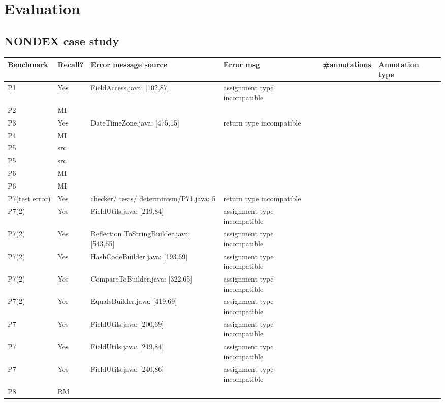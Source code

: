 \section{Evaluation}
\subsection{NONDEX case study}
\begin{table}[]
    \begin{tabular}{|p{1.5cm}|p{1cm}|p{3cm}|p{4cm}|p{2cm}|p{1.5cm}|}
        \hline
        Benchmark & Recall? & Error message source & Error msg & \#annotations & Annotation type  \\ \hline
        P1 & Yes & FieldAccess.java: [102,87] & assignment type incompatible &  &   \\
        P2 & MI &  &  &  &  \\
        P3 & Yes & DateTimeZone.java: [475,15] &  return type incompatible&  &  \\ 
        P4 & MI &  &  &  &  \\ 
        P5 & src &  &  &  &  \\ 
        P5 & src &  &  &  &  \\ 
        P6 & MI &  &  &  &  \\ 
        P6 & MI &  &  &  &  \\
        P7(test error) & Yes & checker/ tests/ determinism/P71.java: 5 & return type incompatible &  &  \\ 
        P7(2) & Yes & FieldUtils.java: [219,84] & assignment type incompatible &  &  \\
        P7(2) & Yes & Reflection ToStringBuilder.java: [543,65]  & assignment type incompatible &  &  \\
        P7(2) & Yes & HashCodeBuilder.java: [193,69]  & assignment type incompatible &  &  \\
        P7(2) & Yes & CompareToBuilder.java: [322,65] & assignment type incompatible &  &  \\
        P7(2) & Yes & EqualsBuilder.java: [419,69]  & assignment type incompatible &  &  \\
        P7 & Yes & FieldUtils.java: [200,69] & assignment type incompatible & &  \\
        P7 & Yes & FieldUtils.java: [219,84] & assignment type incompatible &  &  \\
        P7 & Yes & FieldUtils.java: [240,86] & assignment type incompatible &  &  \\
        P8 & RM &  &  &  &  \\

\end{tabular}
\end{table}
